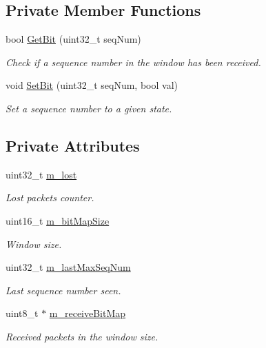 \subsection*{Private Member Functions}
\begin{DoxyCompactItemize}
\item 
bool \hyperlink{classns3_1_1PacketLossCounter_a548b759d404415f50111047786ee09d0}{Get\+Bit} (uint32\+\_\+t seq\+Num)
\begin{DoxyCompactList}\small\item\em Check if a sequence number in the window has been received. \end{DoxyCompactList}\item 
void \hyperlink{classns3_1_1PacketLossCounter_a196384cef20a0a9134ff61f505773d71}{Set\+Bit} (uint32\+\_\+t seq\+Num, bool val)
\begin{DoxyCompactList}\small\item\em Set a sequence number to a given state. \end{DoxyCompactList}\end{DoxyCompactItemize}
\subsection*{Private Attributes}
\begin{DoxyCompactItemize}
\item 
uint32\+\_\+t \hyperlink{classns3_1_1PacketLossCounter_a764928ff787c0586db03f92f1e7babb1}{m\+\_\+lost}
\begin{DoxyCompactList}\small\item\em Lost packets counter. \end{DoxyCompactList}\item 
uint16\+\_\+t \hyperlink{classns3_1_1PacketLossCounter_afb7f1479593f5ffe9352772e8a37dfa1}{m\+\_\+bit\+Map\+Size}
\begin{DoxyCompactList}\small\item\em Window size. \end{DoxyCompactList}\item 
uint32\+\_\+t \hyperlink{classns3_1_1PacketLossCounter_a4d24c5d85acd4bcaa976d0e2e9ebcc8d}{m\+\_\+last\+Max\+Seq\+Num}
\begin{DoxyCompactList}\small\item\em Last sequence number seen. \end{DoxyCompactList}\item 
uint8\+\_\+t $\ast$ \hyperlink{classns3_1_1PacketLossCounter_aaef80a448508d9395f6d9663ef2cf301}{m\+\_\+receive\+Bit\+Map}
\begin{DoxyCompactList}\small\item\em Received packets in the window size. \end{DoxyCompactList}\end{DoxyCompactItemize}


